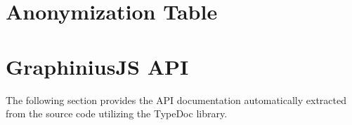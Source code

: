 
\chapter{Anonymization Table}
\label{App:AppendixA}
{
}

\chapter{GraphiniusJS API}
\label{App:AppendixB}

The following section provides the API documentation automatically extracted from the source code utilizing the TypeDoc library.

\begin{landscape}
		
\end{landscape}

